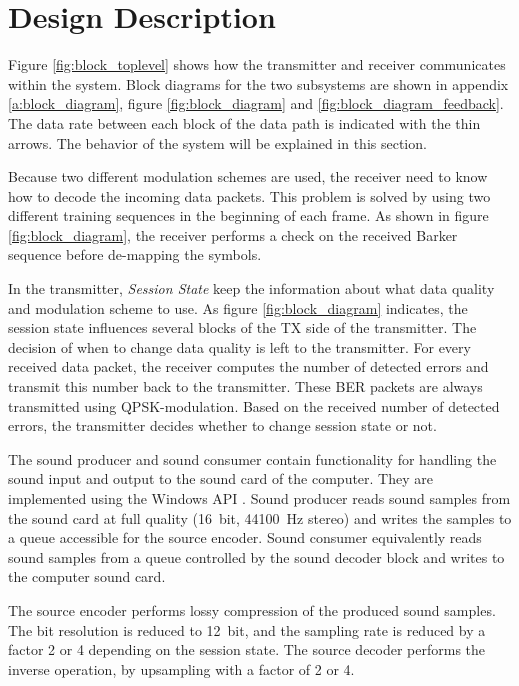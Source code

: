 \section{Design Description}
\label{sec:design_description}
Figure \ref{fig:block_toplevel} shows how the transmitter and receiver communicates within the system. Block diagrams for the two subsystems are shown in appendix \ref{a:block_diagram}, figure \ref{fig:block_diagram} and \ref{fig:block_diagram_feedback}. The data rate between each block of the data path is indicated with the thin arrows. The behavior of the system will be explained in this section. 

Because two different modulation schemes are used, the receiver need to know how to decode the incoming data packets. This problem is solved by using two different training sequences in the beginning of each frame. As shown in figure \ref{fig:block_diagram}, the receiver performs a check on the received Barker sequence before de-mapping the symbols. 

In the transmitter, \textit{Session State} keep the information about what data quality and modulation scheme to use. As figure \ref{fig:block_diagram} indicates, the session state influences several blocks of the TX side of the transmitter. The decision of when to change data quality is left to the transmitter. For every received data packet, the receiver computes the number of detected errors and transmit this number back to the transmitter. These BER packets are always transmitted using QPSK-modulation. Based on the received number of detected errors, the transmitter decides whether to change session state or not. 

The sound producer and sound consumer contain functionality for handling the sound input and output to the sound card of the computer. They are implemented using the Windows API \cite{WinAPI}. Sound producer reads sound samples from the sound card at full quality (\SI{16}{bit}, \SI{44100}{Hz} stereo) and writes the samples to a queue accessible for the source encoder. Sound consumer equivalently reads sound samples from a queue controlled by the sound decoder block and writes to the computer sound card. 

The source encoder performs lossy compression of the produced sound samples. The bit resolution is reduced to \SI{12}{bit}, and the sampling rate is reduced by a factor 2 or 4 depending on the session state. The source decoder performs the inverse operation, by upsampling with a factor of 2 or 4.  


